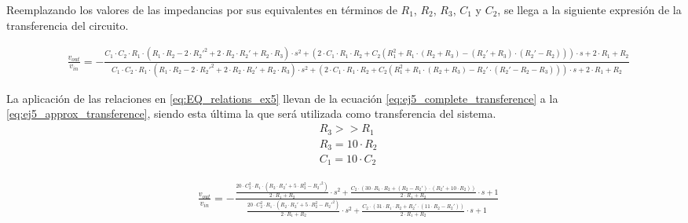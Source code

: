 Reemplazando los valores de las impedancias por sus equivalentes en términos de $R_1$, $R_2$, $R_3$, $C_1$ y $C_2$, se llega a la siguiente expresión de la transferencia del circuito.
\begin{ssmall}
\begin{adjustwidth*}{-1.3cm}{}
    \begin{align}
        &\frac{v_{out}}{v_{in}} = - \frac{C_1 \cdot C_2 \cdot R_1 \cdot \left(R_1 \cdot R_2 - 2 \cdot R_2'^2 + 2 \cdot R_2 \cdot R_2' + R_2 \cdot R_3\right) \cdot s^2 +
                                        \left(2 \cdot C_1 \cdot R_1 \cdot R_2 + C_2 \left(R_1^2 + R_1 \cdot \left(R_2 + R_3\right) - \left(R_2' + R_3\right) \cdot \left(R_2' - R_2\right)\right)\right) \cdot s +
                                        2 \cdot R_1 + R_2}
                                        {C_1 \cdot C_2 \cdot R_1 \cdot \left(R_1 \cdot R_2 - 2 \cdot R_2'^2 + 2 \cdot R_2 \cdot R_2' + R_2 \cdot R_3\right) \cdot s^2 +
                                        \left(2 \cdot C_1 \cdot R_1 \cdot R_2 + C_2 \left(R_1^2 + R_1 \cdot \left(R_2 + R_3\right) - R_2' \cdot \left(R_2' - R_2 - R_3\right)\right)\right) \cdot s +
                                        2 \cdot R_1 + R_2} \label{eq:ej5_complete_transference}
    \end{align}
\end{adjustwidth*}
\end{ssmall}

La aplicación de las relaciones en \ref{eq:EQ_relations_ex5} llevan de la ecuación \ref{eq:ej5_complete_transference} a la \ref{eq:ej5_approx_transference}, 
siendo esta última la que será utilizada como transferencia del sistema.
\begin{align}
    &R_3 >> R_1 \label{eq:EQ_relations_ex5}\\
    &R_3 = 10 \cdot R_2 \\
    &C_1 = 10 \cdot C_2
\end{align}

\begin{align}
    &\frac{v_{out}}{v_{in}} = - \frac{\frac{20 \cdot C_2^2 \cdot R_1 \cdot \left(R_2 \cdot R_2' + 5 \cdot R_2^2 - R_2'^2\right)}{2 \cdot R_1 + R_2} \cdot s^2 +
                                        \frac{C_2 \cdot \left(30 \cdot R_1 \cdot R_2 + \left(R_2 - R_2'\right) \cdot \left(R_2' + 10 \cdot R_2\right)\right)}{2 \cdot R_1 + R_2} \cdot s +
                                        1}
                                        {\frac{20 \cdot C_2^2 \cdot R_1 \cdot \left(R_2 \cdot R_2' + 5 \cdot R_2^2 - R_2'^2\right)}{2 \cdot R_1 + R_2} \cdot s^2 +
                                        \frac{C_2 \cdot \left(31 \cdot R_1 \cdot R_2 + R_2' \cdot \left(11 \cdot R_2 - R_2'\right)\right)}{2 \cdot R_1 + R_2} \cdot s +
                                        1} \label{eq:ej5_approx_transference}
\end{align}

